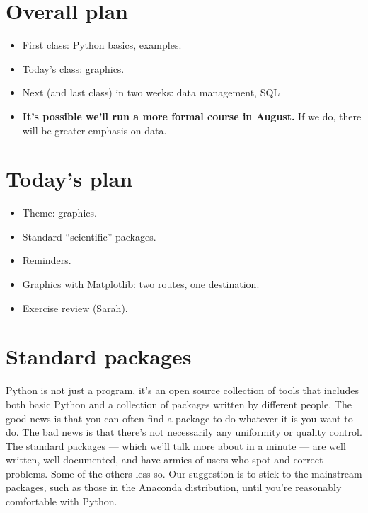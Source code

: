 \documentclass[11pt]{article}
\begin{document}
\section{Overall plan}

\begin{itemize}
\item First class:  Python basics, examples.
\item Today's class:  graphics.
\item Next (and last class) in two weeks:  data management, SQL
\item {\bf It's possible we'll run a more formal course in August.}
If we do, there will be greater emphasis on data.  
\end{itemize}


\section{Today's plan}

\begin{itemize}
\item Theme:  graphics.
\item Standard ``scientific'' packages.
\item Reminders.
\item Graphics with Matplotlib: two routes, one destination.
\item Exercise review (Sarah).
\end{itemize}


\section{Standard packages}

Python is not just a program, it's an open source collection of tools
that includes both basic
Python and a collection of packages written by different people.
The good news is that you can often find a package to do whatever it is
you want to do.
The bad news is that there's not necessarily any uniformity or quality control.
The standard packages --- which we'll talk more about in a minute ---
are well written, well documented, and have armies of users who spot and correct
problems.
Some of the others less so.
Our suggestion is to stick to the mainstream packages, such as those in the
\href{http://docs.continuum.io/anaconda/pkg-docs.html}{Anaconda distribution},
until you're reasonably comfortable with Python.
\end{document}
